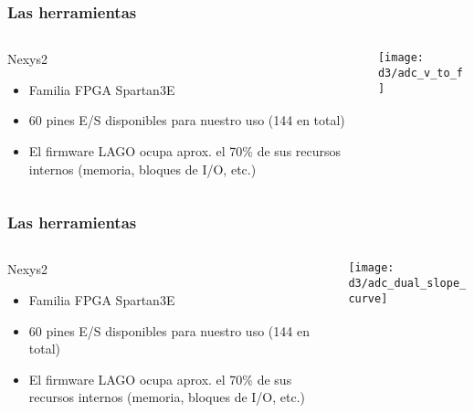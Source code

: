 \documentclass{beamer}
\begin{document}
\begin{frame}
\frametitle{Las herramientas}
  \begin{columns}
    \begin{column}{0.45\textwidth}
      \begin{block}{Nexys2}
        \begin{itemize}
          \item  Familia FPGA Spartan3E
          \item  60 pines E/S disponibles para nuestro uso (144 en total)
          \item  El firmware LAGO ocupa aprox. el 70\% de sus recursos internos
                 (memoria, bloques de I/O, etc.)
        \end{itemize}
      \end{block}
    \end{column} 
    \begin{column}{0.65\textwidth}
      \texttt{[image: d3/adc\_v\_to\_f]}
    \end{column}
  \end{columns}
\end{frame}

\begin{frame}
\frametitle{Las herramientas}
  \begin{columns}
    \begin{column}{0.45\textwidth}
      \begin{block}{Nexys2}
        \begin{itemize}
          \item  Familia FPGA Spartan3E
          \item  60 pines E/S disponibles para nuestro uso (144 en total)
          \item  El firmware LAGO ocupa aprox. el 70\% de sus recursos internos
                 (memoria, bloques de I/O, etc.)
        \end{itemize}
      \end{block}
    \end{column} 
    \begin{column}{0.65\textwidth}
      \texttt{[image: d3/adc\_dual\_slope\_curve]}
    \end{column}
  \end{columns}
\end{frame}
\end{document}
